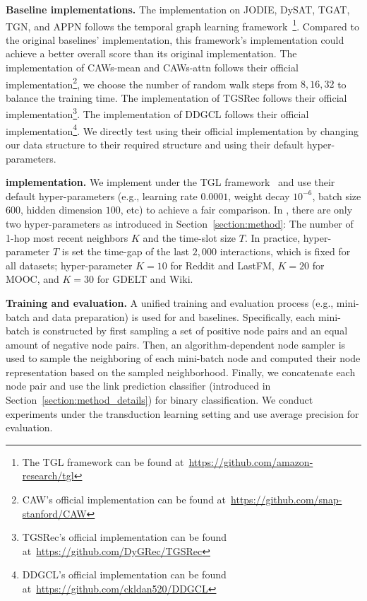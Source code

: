 \noindent\textbf{Baseline implementations.}
The implementation on JODIE, DySAT, TGAT, TGN, and APPN follows the temporal graph learning framework~\cite{zhou2022tgl}\footnote{The TGL framework can be found at~\url{https://github.com/amazon-research/tgl}}.
Compared to the original baselines' implementation, this framework's implementation could achieve a better overall score than its original implementation. 
The implementation of CAWs-mean and CAWs-attn follows their official implementation\footnote{CAW's official implementation can be found at~\url{https://github.com/snap-stanford/CAW}}, we choose the number of random walk steps from $8, 16, 32$ to balance the training time.
The implementation of TGSRec follows their official implementation\footnote{TGSRec's official implementation can be found at~\url{https://github.com/DyGRec/TGSRec}}.
The implementation of DDGCL follows their official implementation\footnote{DDGCL's official implementation can be found at~\url{https://github.com/ckldan520/DDGCL}}.
We directly test using their official implementation by changing our data structure to their required structure and using their default hyper-parameters.

\noindent\textbf{\our implementation.}
We implement \our under the TGL framework~\cite{zhou2022tgl} and use their default hyper-parameters (e.g., learning rate $0.0001$, weight decay $10^{-6}$, batch size $600$, hidden dimension $100$, etc) to achieve a fair comparison.
In \oure, there are only two hyper-parameters as introduced in Section~\ref{section:method}: The number of 1-hop most recent neighbors $K$ and the time-slot size $T$. In practice, hyper-parameter $T$ is set the time-gap of the last $2,000$ interactions, which is fixed for all datasets; hyper-parameter $K=10$ for Reddit and LastFM, $K=20$ for MOOC, and $K=30$ for GDELT and Wiki. 


\noindent\textbf{Training and evaluation.}
A unified training and evaluation process (e.g., mini-batch and data preparation) is used for \our and baselines. Specifically, each mini-batch is constructed by first sampling a set of positive node pairs and an equal amount of negative node pairs. Then, an algorithm-dependent node sampler is used to sample the neighboring of each mini-batch node and computed their node representation based on the sampled neighborhood. Finally, we concatenate each node pair and use the link prediction classifier (introduced in Section~\ref{section:method_details}) for binary classification. We conduct experiments under the transduction learning setting and use average precision for evaluation.

